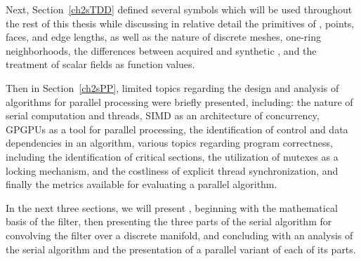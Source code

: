 Next, Section~\ref{ch2sTDD} defined several symbols which will be used throughout the rest of this thesis while discussing in relative detail the primitives of \tdd{}, points, faces, and edge lengths, as well as the nature of discrete meshes, one-ring neighborhoods, the differences between acquired and synthetic \tdd{}, and the treatment of scalar fields as function values.

Then in Section~\ref{ch2sPP}, limited topics regarding the design and analysis of algorithms for parallel processing were briefly presented, including: the nature of serial computation and threads, SIMD as an architecture of concurrency, GPGPUs as a tool for parallel processing, the identification of control and data dependencies in an algorithm, various topics regarding program correctness, including the identification of critical sections, the utilization of mutexes as a locking mechanism, and the costliness of explicit thread synchronization, and finally the metrics available for evaluating a parallel algorithm.

In the next three sections, we will present , beginning with the mathematical basis of the filter, then presenting the three parts of the serial algorithm for convolving the filter over a discrete manifold, and concluding with an analysis of the serial algorithm and the presentation of a parallel variant of each of its parts.

